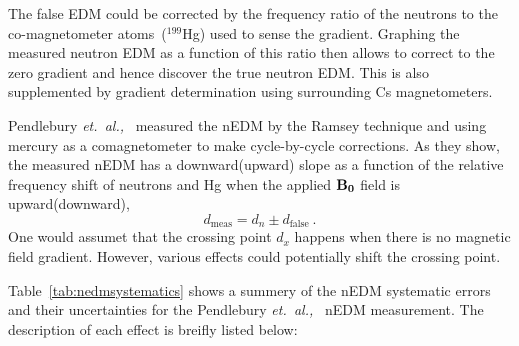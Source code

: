 The false EDM could be corrected by the frequency ratio of the
neutrons to the co-magnetometer atoms~($^{199}$Hg) used to sense the
gradient. Graphing the measured neutron EDM as a function of this
ratio then allows to correct to the zero gradient and hence discover
the true neutron EDM. This is also supplemented by gradient
determination using surrounding Cs magnetometers.


Pendlebury {\it{et.~al.,}}~\cite{Pendlebury2015} measured the nEDM by
the Ramsey technique and using mercury as a comagnetometer to make
cycle-by-cycle corrections.  As they show, the measured nEDM has a
downward(upward) slope as a function of the relative frequency shift
of neutrons and Hg when the applied $\bf{B_0}$ field is
upward(downward),
\begin{equation}
  d_{\mathrm {meas}}= d_n \pm d_{\mathrm{false}}~.
\end{equation}
One would assumet that the crossing point $d_x$ happens when there is
no magnetic field gradient. However, various effects could potentially
shift the crossing point.


Table~\ref{tab:nedmsystematics} shows a summery of the nEDM systematic
errors and their uncertainties for the Pendlebury
{\it{et.~al.,}}~\cite{Pendlebury2015} nEDM measurement. The
description of each effect is breifly listed below:

